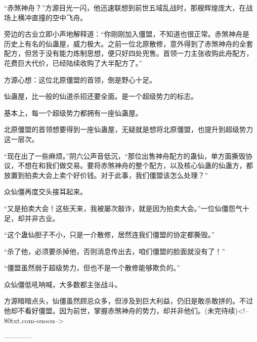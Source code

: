 \begin{this_body}
“赤煞神舟？”方源目光一闪，他迅速联想到前世五域乱战时，那艘辉煌庞大，在战场上横冲直撞的空中飞舟。

旁边的古业立即小声地解释道：“你刚刚加入僵盟，不知道也很正常。赤煞神舟是历史上有名的仙蛊屋，威力极大。之前一位北原散修，意外得到了赤煞神舟的全套配方，但苦于没有能力炼制思想，便只好四处兜售。首领一力主张收购此舟配方，花费巨大代价，已经陆续收购了大半配方了。”

方源心想：这位北原僵盟的首领，倒是野心十足。

仙蛊屋，比一般的仙道杀招还要全面。是一个超级势力的标志。

基本上，每一个超级势力都拥有一座仙蛊屋。

北原僵盟的首领想要得到一座仙蛊屋，无疑就是想将北原僵盟，也提升到超级势力这一层次。

“现在出了一些麻烦。”阴六公声音低沉，“那位出售神舟配方的蛊仙，单方面撕毁协议，不想在和我们做交易。要将赤煞神舟的整个配方，以及核心仙蛊的仙蛊方，都放置到拍卖大会上卖个好价钱。对于此事，我们僵盟该怎么处理？”

众仙僵再度交头接耳起来。

“又是拍卖大会！这些天来，我被屡次敲诈，就是因为拍卖大会。”一位仙僵怨气十足，却并非古业。

“这个蛊仙胆子不小，只是一介散修，居然连我们僵盟的协定都撕毁。”

“杀了他，必须要杀掉他，否则消息传出去，咱们僵盟的脸面就没有了！”

“僵盟虽然弱于超级势力，但也不是一个散修能够欺负的。”

众仙僵低吼呐喊，大多数都主张战斗。

方源暗暗点头，仙僵虽然顾忌众多，但涉及到巨大利益，仍旧是敢杀敢拼的。不过他却不看好僵盟。因为前世，掌握赤煞神舟的势力，却并非他们。(未完待续)<!--80txt.com-ouoou-->

------------

\end{this_body}

